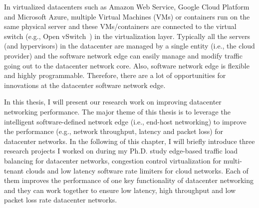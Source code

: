 In virtualized datacenters such as Amazon Web Service, Google Cloud Platform and Microsoft Azure, 
multiple Virtual Machines (VMs) or containers run on the same physical server and these VMs/containers 
are connected to the virtual switch (e.g., Open vSwitch~\cite{Pfaff2015ovs}) in the virtualization layer. 
Typically all the servers (and hypervisors) in the datacenter are managed by a single entity (i.e., the cloud provider) 
and the software network edge can easily manage and modify traffic going out to the datacenter network core.
Also, software network edge is flexible and highly programmable. Therefore, there are a lot of 
opportunities for innovations at the datacenter software network edge.


\iffalse
In cloud computing, one of the key technology trends is software-defined datacenters. 
In particular, Software-defined Networking (SDN) technology has been widely 
applied in datacenter environments and has enhanced the agility and performance of datacenter networks.
In 2007, Casado et al presented a control plane and dataplane separation network architecture for 
Enterprise networks named Ethane~\cite{casado2007ethane}. 
In 2008, networking researchers, McKeown et al, argued that today's computer network 
devices (i.e., switch and routers) were commercialized black boxes, 
and it was increasingly harder for networking researchers to invent and test new networking 
techniques on existing networking devices. Their white paper~\cite{McKeown08} described the initial motivation 
for OpenFlow. Ethane and OpenFlow started the revolution of Software-defined Networking (SDN). 
Later on, an open source implementation of SDN-capable virtual switch, Open vSwitch (OVS)~\cite{Pfaff2015ovs}, was released. 
OVS has been widely deployed in cloud computing platforms to support network virtualization functionalities and 
meet SDN-style network management requirements.
OVS opened the door of software-define network edge (i.e., end-host networking) in datacenter environments.
End-host networking covers many components, for example, TCP/IP stack, virtual switch, rate limiters and NIC hardware. 
In a datacenter network, all the servers (and hypervisors) are managed by a single entity 
(i.e., the cloud provider), therefore, there are a lof of opportunities for innovations, 
especially the innovations in end-host networking.
\fi

In this thesis, I will present our research work on improving datacenter networking performance. 
The major theme of this thesis is to leverage the intelligent software-defined network 
edge (i.e., end-host networking) to improve the performance (e.g., network throughput, latency and packet loss) 
for datacenter networks.
In the following of this chapter, I will briefly introduce three research projects I worked on 
during my Ph.D. study \textemdash\xspace edge-based traffic load balancing for 
datacenter networks, congestion control virtualization for multi-tenant clouds and 
low latency software rate limiters for cloud networks.
Each of them improves the performance of one key functionality of datacenter networking and
they can work together to ensure low latency, high throughput and low packet loss rate
datacenter networks. 

